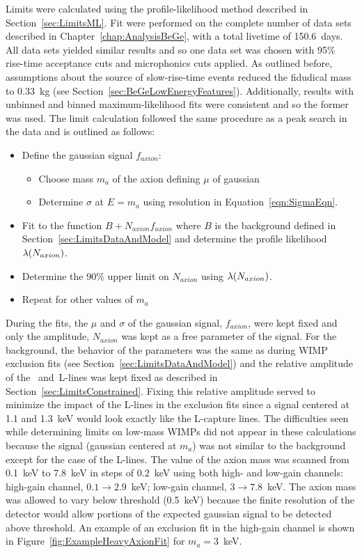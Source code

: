 	Limits were calculated using the profile-likelihood method described in Section~\ref{sec:LimitsML}.  Fit were performed on the complete number of data sets described in Chapter~\ref{chap:AnalysisBeGe}, with a total livetime of 150.6~days.  All data sets yielded similar results and so one data set was chosen with 95\% rise-time acceptance cuts and microphonics cuts applied.  As outlined before, assumptions about the source of slow-rise-time events reduced the fidudical mass to 0.33~kg (see Section~\ref{sec:BeGeLowEnergyFeatures}).  Additionally, results with unbinned and binned maximum-likelihood fits were consistent and so the former was used.  The limit calculation followed the same procedure as a peak search in the data and is outlined as follows:
		\begin{itemize}
			\item Define the gaussian signal $f_{axion}$: 
			\begin{itemize}
				\item Choose mass $m_{a}$ of the axion defining $\mu$ of gaussian
				\item Determine $\sigma$ at $E = m_{a}$ using resolution in Equation~\ref{eqn:SigmaEqn}.
			\end{itemize}
			\item Fit to the function $B + N_{axion} f_{axion}$ where $B$ is the background defined in Section~\ref{sec:LimitsDataAndModel} and determine the profile likelihood $\lambda(N_{axion})$.
			\item Determine the 90\% upper limit on $N_{axion}$ using $\lambda(N_{axion})$.
			\item Repeat for other values of $m_{a}$
		\end{itemize}		
	
	During the fits, the $\mu$ and $\sigma$ of the gaussian signal, $f_{axion}$, were kept fixed and only the amplitude, $N_{axion}$ was kept as a free parameter of the signal.  For the background, the behavior of the parameters was the same as during WIMP exclusion fits (see Section~\ref{sec:LimitsDataAndModel}) and the relative amplitude of the \gersixeight~and\znsixfive~L-lines was kept fixed as described in Section~\ref{sec:LimitsConstrained}.  Fixing this relative amplitude served to minimize the impact of the L-lines in the exclusion fits since a signal centered at 1.1 and 1.3~keV would look exactly like the L-capture lines.  The difficulties seen while determining limits on low-mass WIMPs did not appear in these calculations because the signal (gaussian centered at $m_{a}$) was not similar to the background except for the case of the L-lines.  The value of the axion mass was scanned from 0.1~keV to 7.8~keV in steps of 0.2~keV using both high- and low-gain channels: high-gain channel, $0.1\to2.9$~keV; low-gain channel, $3\to7.8$~keV.  The axion mass was allowed to vary below threshold (0.5~keV) because the finite resolution of the detector would allow portions of the expected gaussian signal to be detected above threshold.  An example of an exclusion fit in the high-gain channel is shown in Figure~\ref{fig:ExampleHeavyAxionFit} for $m_{a}=3$~keV.  

